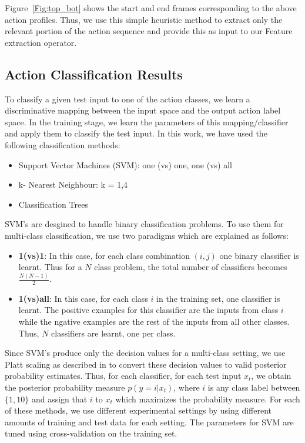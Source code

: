 \documentclass[10pt,twocolumn,letterpaper]{article}
\begin{document}
Figure~\ref{Fig:top_bot} shows the start and end frames corresponding to the above action profiles. Thus, we use this simple heuristic method to extract only the relevant portion of the action sequence and provide this as input to our Feature extraction operator. 


\subsection{Action Classification Results}
To classify a given test input to one of the action classes, we learn a discriminative mapping between the input space and the output action label space. In the training stage, we learn the parameters of this mapping/classifier and apply them to classify the test input. In this work, we have used the following classification methods:
\begin{itemize}
\item Support Vector Machines (SVM): one (vs) one, one (vs) all 
\item k- Nearest Neighbour: k = 1,4
\item Classification Trees
\end{itemize}

SVM's are desgined to handle binary classification problems. To use them for multi-class classification, we use two paradigms which are explained as follows:
\begin{itemize}
\item \textbf{1(vs)1}: In this case, for each class combination $(i,j)$ one binary classifier is learnt. Thus for a $N$ class problem, the total number of classifiers becomes $\frac{N(N-1)}{2}$. 

\item \textbf{1(vs)all}: In this case, for each class $i$ in the training set, one classifier is learnt. The positive examples for this classifier are the inputs from class $i$ while the ngative examples are the rest of the inputs from all other classes. Thus, $N$ classifiers are learnt, one per class. 
\end{itemize}

Since SVM's produce only the decision values for a multi-class setting, we use Platt scaling as described in \cite{Platt1999} to convert these decision values to valid posterior probability estimates. Thus, for each classifier, for each test input $x_t$, we obtain the posterior probability measure $p(y=i|x_t)$, where $i$ is any class label between $\{1,10\}$ and assign that $i$  to $x_t$ which maximizes the probability measure. 
For each of these methods, we use different experimental settings by using different amounts of training and test data for each setting. The parameters for SVM are tuned using cross-validation  on the training set. 
\end{document}

